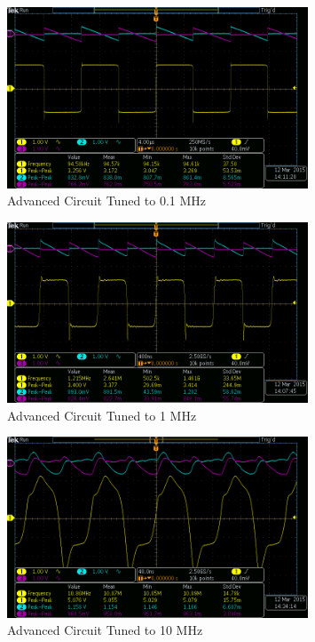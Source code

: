 \documentclass[titlepage, letterpaper, 10.5pt]{article}
\begin{document}
\begin{figure}[ht]
	\centering
	\includegraphics[width=0.8\textwidth]{results/advanced-100kHz}
	\caption{Advanced Circuit Tuned to 0.1 MHz}
	\label{advanced-100kHz}
\end{figure}

\begin{figure}[ht]
	\centering
	\includegraphics[width=0.8\textwidth]{results/advanced-1MHz}
	\caption{Advanced Circuit Tuned to 1 MHz}
	\label{advanced-1MHz}
\end{figure}

\begin{figure}[ht]
	\centering
	\includegraphics[width=0.8\textwidth]{results/advanced-10MHz}
	\caption{Advanced Circuit Tuned to 10 MHz}
	\label{advanced-10MHz}
\end{figure}
\end{document}

